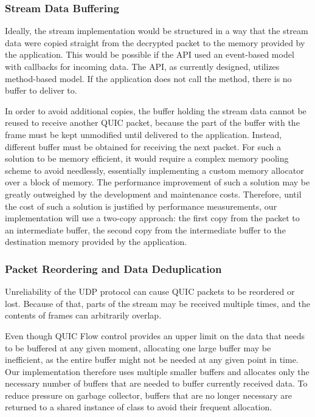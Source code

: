 \subsubsection{Stream Data Buffering}

Ideally, the stream implementation would be structured in a way that the stream data were copied
straight from the decrypted packet to the memory provided by the application. This would be possible
if the API used an event-based model with callbacks for incoming data. The API, as currently
designed, utilizes method-based model. If the application does not call the 
method, there is no buffer to deliver to.

In order to avoid additional copies, the buffer holding the stream data cannot be reused to receive
another QUIC packet, because the part of the buffer with the \STREAM{} frame must be kept unmodified
until delivered to the application. Instead, different buffer must be obtained for receiving the
next packet. For such a solution to be memory efficient, it would require a complex memory pooling
scheme to avoid needlessly, essentially implementing a custom memory allocator over a block of
memory. The performance improvement of such a solution may be greatly outweighed by the development
and maintenance costs. Therefore, until the cost of such a solution is justified by performance
measurements, our implementation will use a two-copy approach: the first copy from the packet to an
intermediate buffer, the second copy from the intermediate buffer to the destination memory provided
by the application.




\subsubsection{Packet Reordering and Data Deduplication}

Unreliability of the UDP protocol can cause QUIC packets to be reordered or lost. Because of that,
parts of the stream may be received multiple times, and the contents of \STREAM{} frames can
arbitrarily overlap.

Even though QUIC Flow control provides an upper limit on the data that needs to be buffered at any
given moment, allocating one large buffer may be inefficient, as the entire buffer might not be
needed at any given point in time. Our implementation therefore uses multiple smaller buffers and
allocates only the necessary number of buffers that are needed to buffer currently received data. To
reduce pressure on garbage collector, buffers that are no longer necessary are returned to a shared
instance of  class to avoid their frequent allocation.

